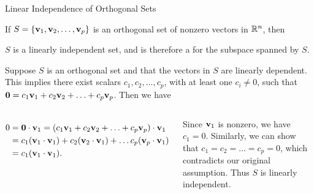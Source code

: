 \documentclass[xcolor=dvipsnames,aspectratio=169,t]{beamer}
\begin{document}
\begin{frame}{Linear Independence of Orthogonal Sets}
  \begin{theorem}
  If $S = \left\{ \mathbf{v}_1 , \mathbf{v}_2 , \ldots , \mathbf{v}_p \right\}$ is an \alert{orthogonal set} of \alert{nonzero} vectors in $\mathbb{R}^n$, then
  \smallskip
  
  $S$ is a \alert{linearly independent} set, and is therefore a  for the subspace spanned by $S$.
  \end{theorem}
  \medskip

  \pause
  \smallskip
  
  Suppose $S$ is an orthogonal set and that the vectors in $S$ are linearly \alert{dependent}.
  This implies there exist scalars $c_1,c_2,\ldots,c_p$, with at least one $c_i \ne 0$,
  such that $\mathbf{0} = c_1 \mathbf{v}_1 + c_2 \mathbf{v}_2 + \ldots + c_p \mathbf{v}_p$.
  \pause Then we have

  \begin{columns}[T]
  \column{0.5\tw} 
  \vspace*{-1em}
  \begin{align*}
  0 &= \mathbf{0} \cdot \mathbf{v}_1 = (c_1 \mathbf{v}_1 + c_2 \mathbf{v}_2 + \ldots + c_p \mathbf{v}_p) \cdot \mathbf{v}_1 \\
  &= c_1( \mathbf{v}_1 \cdot \mathbf{v}_1) + c_2 ( \mathbf{v}_2 \cdot \mathbf{v}_1) + \ldots c_p ( \mathbf{v}_p \cdot \mathbf{v}_1) \\
  &= c_1( \mathbf{v}_1 \cdot \mathbf{v}_1).
  \end{align*}

  \column{0.5\tw}
  \pause
  Since $\mathbf{v}_1$ is nonzero, we have $c_1=0$.
  Similarly, we can show that $c_1 = c_2 = \ldots = c_p =0$,
  which contradicts our original assumption.
  Thus $S$ is \alert{linearly independent}.
  \end{columns}
  
  \hfill\blue{$\qed$}
\end{frame}
\end{document}
